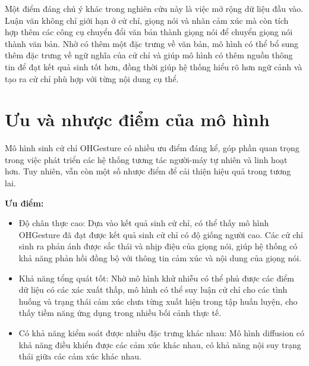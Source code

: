 Một điểm đáng chú ý khác trong nghiên cứu này là việc mở rộng dữ liệu đầu vào. Luận văn không chỉ giới hạn ở cử chỉ, giọng nói và nhãn cảm xúc mà còn tích hợp thêm các công cụ chuyển đổi văn bản thành giọng nói để chuyển giọng nói thành văn bản. Nhờ có thêm một đặc trưng về văn bản, mô hình có thể bổ sung thêm đặc trưng về ngữ nghĩa của cử chỉ và giúp mô hình có thêm nguồn thông tin để đạt kết quả sinh tốt hơn, đồng thời giúp hệ thống hiểu rõ hơn ngữ cảnh và tạo ra cử chỉ phù hợp với từng nội dung cụ thể.




\section{Ưu và nhược điểm của mô hình}


Mô hình sinh cử chỉ OHGesture có nhiều ưu điểm đáng kể, góp phần quan trọng trong việc phát triển các hệ thống tương tác người-máy tự nhiên và linh hoạt hơn. Tuy nhiên, vẫn còn một số nhược điểm để cải thiện hiệu quả trong tương lai.

\vspace{10pt}

\textbf{Ưu điểm:}

\begin{itemize}
	\item Độ chân thực cao: Dựa vào kết quả sinh cử chỉ, có thể thấy mô hình OHGesture đã đạt được kết quả sinh cử chỉ có độ giống người cao. Các cử chỉ sinh ra phản ánh được sắc thái và nhịp điệu của giọng nói, giúp hệ thống có khả năng phản hồi đồng bộ với thông tin cảm xúc và nội dung của giọng nói.
	
	\item Khả năng tổng quát tốt: Nhờ mô hình khử nhiễu có thể phủ được các điểm dữ liệu có các xác xuất thấp, mô hình có thể suy luận cử chỉ cho các tình huống và trạng thái cảm xúc chưa từng xuất hiện trong tập huấn luyện, cho thấy tiềm năng ứng dụng trong nhiều bối cảnh thực tế.
	
	\item Có khả năng kiểm soát được nhiều đặc trưng khác nhau: Mô hình diffusion có khả năng điều khiển được các cảm xúc khác nhau, có khả năng nội suy trạng thái giữa các cảm xúc khác nhau.
	
	
	
	\end{itemize}



